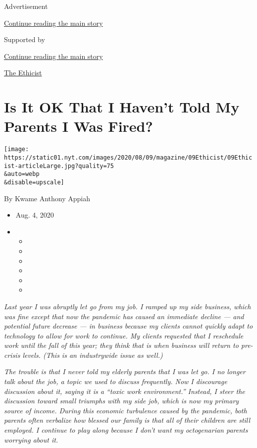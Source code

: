 Advertisement

\protect\hyperlink{after-top}{Continue reading the main story}

Supported by

\protect\hyperlink{after-sponsor}{Continue reading the main story}

\href{/column/the-ethicist}{The Ethicist}

\hypertarget{is-it-ok-that-i-havent-told-my-parents-i-was-fired}{%
\section{Is It OK That I Haven't Told My Parents I Was
Fired?}\label{is-it-ok-that-i-havent-told-my-parents-i-was-fired}}

\texttt{[image: https://static01.nyt.com/images/2020/08/09/magazine/09Ethicist/09Ethicist-articleLarge.jpg?quality=75\\\&auto=webp\\\&disable=upscale]}

By Kwame Anthony Appiah

\begin{itemize}
\item
  Aug. 4, 2020
\item
  \begin{itemize}
  \item
  \item
  \item
  \item
  \item
  \item
  \end{itemize}
\end{itemize}

\emph{Last year I was abruptly let go from my job. I ramped up my side
business, which was fine except that now the pandemic has caused an
immediate decline --- and potential future decrease --- in business
because my clients cannot quickly adapt to technology to allow for work
to continue. My clients requested that I reschedule work until the fall
of this year; they think that is when business will return to pre-crisis
levels. (This is an industrywide issue as well.)}

\emph{The trouble is that I never told my elderly parents that I was let
go. I no longer talk about the job, a topic we used to discuss
frequently. Now I discourage discussion about it, saying it is a ``toxic
work environment.'' Instead, I steer the discussion toward small
triumphs with my side job, which is now my primary source of income.
During this economic turbulence caused by the pandemic, both parents
often verbalize how blessed our family is that all of their children are
still employed. I continue to play along because I don't want my
octogenarian parents worrying about it.}

